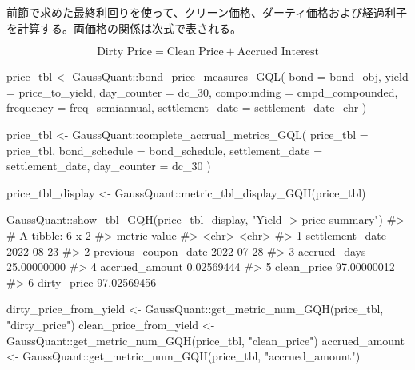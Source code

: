 \documentclass[
  letterpaper,
  DIV=11,
  numbers=noendperiod]{scrreprt}
\newenvironment{Shaded}{\begin{snugshade}}{\end{snugshade}}
\newcommand{\AttributeTok}[1]{\textcolor[rgb]{0.40,0.45,0.13}{#1}}
\newcommand{\CommentTok}[1]{\textcolor[rgb]{0.37,0.37,0.37}{#1}}
\newcommand{\FunctionTok}[1]{\textcolor[rgb]{0.28,0.35,0.67}{#1}}
\newcommand{\NormalTok}[1]{\textcolor[rgb]{0.00,0.23,0.31}{#1}}
\newcommand{\OtherTok}[1]{\textcolor[rgb]{0.00,0.23,0.31}{#1}}
\newcommand{\SpecialCharTok}[1]{\textcolor[rgb]{0.37,0.37,0.37}{#1}}
\newcommand{\StringTok}[1]{\textcolor[rgb]{0.13,0.47,0.30}{#1}}
\begin{document}
前節で求めた最終利回りを使って、クリーン価格、ダーティ価格および経過利子を計算する。両価格の関係は次式で表される。

\[
\text{Dirty Price}=\text{Clean Price}+\text{Accrued Interest}
\]

\begin{Shaded}
\begin{Highlighting}[]
\NormalTok{price\_tbl }\OtherTok{\textless{}{-}}\NormalTok{ GaussQuant}\SpecialCharTok{::}\FunctionTok{bond\_price\_measures\_GQL}\NormalTok{(}
  \AttributeTok{bond =}\NormalTok{ bond\_obj,}
  \AttributeTok{yield =}\NormalTok{ price\_to\_yield,}
  \AttributeTok{day\_counter =}\NormalTok{ dc\_30,}
  \AttributeTok{compounding =}\NormalTok{ cmpd\_compounded,}
  \AttributeTok{frequency =}\NormalTok{ freq\_semiannual,}
  \AttributeTok{settlement\_date =}\NormalTok{ settlement\_date\_chr}
\NormalTok{)}

\NormalTok{price\_tbl }\OtherTok{\textless{}{-}}\NormalTok{ GaussQuant}\SpecialCharTok{::}\FunctionTok{complete\_accrual\_metrics\_GQL}\NormalTok{(}
  \AttributeTok{price\_tbl =}\NormalTok{ price\_tbl,}
  \AttributeTok{bond\_schedule =}\NormalTok{ bond\_schedule,}
  \AttributeTok{settlement\_date =}\NormalTok{ settlement\_date,}
  \AttributeTok{day\_counter =}\NormalTok{ dc\_30}
\NormalTok{)}

\NormalTok{price\_tbl\_display }\OtherTok{\textless{}{-}}\NormalTok{ GaussQuant}\SpecialCharTok{::}\FunctionTok{metric\_tbl\_display\_GQH}\NormalTok{(price\_tbl)}

\NormalTok{GaussQuant}\SpecialCharTok{::}\FunctionTok{show\_tbl\_GQH}\NormalTok{(price\_tbl\_display, }\StringTok{"Yield {-}\textgreater{} price summary"}\NormalTok{)}
\CommentTok{\#\textgreater{} \# A tibble: 6 x 2}
\CommentTok{\#\textgreater{}   metric               value      }
\CommentTok{\#\textgreater{}   \textless{}chr\textgreater{}                \textless{}chr\textgreater{}      }
\CommentTok{\#\textgreater{} 1 settlement\_date      2022{-}08{-}23 }
\CommentTok{\#\textgreater{} 2 previous\_coupon\_date 2022{-}07{-}28 }
\CommentTok{\#\textgreater{} 3 accrued\_days         25.00000000}
\CommentTok{\#\textgreater{} 4 accrued\_amount       0.02569444 }
\CommentTok{\#\textgreater{} 5 clean\_price          97.00000012}
\CommentTok{\#\textgreater{} 6 dirty\_price          97.02569456}

\NormalTok{dirty\_price\_from\_yield }\OtherTok{\textless{}{-}}\NormalTok{ GaussQuant}\SpecialCharTok{::}\FunctionTok{get\_metric\_num\_GQH}\NormalTok{(price\_tbl, }\StringTok{"dirty\_price"}\NormalTok{)}
\NormalTok{clean\_price\_from\_yield }\OtherTok{\textless{}{-}}\NormalTok{ GaussQuant}\SpecialCharTok{::}\FunctionTok{get\_metric\_num\_GQH}\NormalTok{(price\_tbl, }\StringTok{"clean\_price"}\NormalTok{)}
\NormalTok{accrued\_amount }\OtherTok{\textless{}{-}}\NormalTok{ GaussQuant}\SpecialCharTok{::}\FunctionTok{get\_metric\_num\_GQH}\NormalTok{(price\_tbl, }\StringTok{"accrued\_amount"}\NormalTok{)}


\end{Highlighting}
\end{Shaded}
\end{document}
